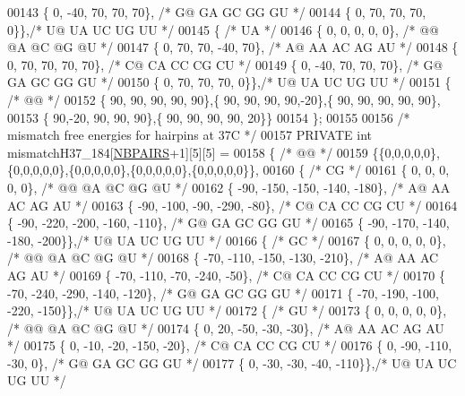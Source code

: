 \begin{DoxyCode}
00143    \{   0,  -40,   70,   70,   70\}, \textcolor{comment}{/* G@  GA  GC  GG  GU */}
00144    \{   0,   70,   70,   70,    0\}\},\textcolor{comment}{/* U@  UA  UC  UG  UU */}
00145   \{ \textcolor{comment}{/* UA */}
00146    \{   0,    0,    0,    0,    0\}, \textcolor{comment}{/* @@  @A  @C  @G  @U */}
00147    \{   0,   70,   70,  -40,   70\}, \textcolor{comment}{/* A@  AA  AC  AG  AU */}
00148    \{   0,   70,   70,   70,   70\}, \textcolor{comment}{/* C@  CA  CC  CG  CU */}
00149    \{   0,  -40,   70,   70,   70\}, \textcolor{comment}{/* G@  GA  GC  GG  GU */}
00150    \{   0,   70,   70,   70,    0\}\},\textcolor{comment}{/* U@  UA  UC  UG  UU */}
00151   \{ \textcolor{comment}{/* @@ */}
00152    \{ 90, 90, 90, 90, 90\},\{ 90, 90, 90, 90,-20\},\{ 90, 90, 90, 90, 90\},
00153    \{ 90,-20, 90, 90, 90\},\{ 90, 90, 90, 90, 20\}\}
00154 \};
00155 
00156 \textcolor{comment}{/* mismatch free energies for hairpins at 37C */}
00157 PRIVATE \textcolor{keywordtype}{int} mismatchH37\_184[\hyperlink{energy__const_8h_a5e75221c779d618eab81e096f37e32ce}{NBPAIRS}+1][5][5] =
00158 \{ \textcolor{comment}{/* @@ */}
00159   \{\{0,0,0,0,0\},\{0,0,0,0,0\},\{0,0,0,0,0\},\{0,0,0,0,0\},\{0,0,0,0,0\}\},
00160   \{ \textcolor{comment}{/* CG */}
00161    \{   0,    0,    0,    0,    0\}, \textcolor{comment}{/* @@  @A  @C  @G  @U */}
00162    \{ -90, -150, -150, -140, -180\}, \textcolor{comment}{/* A@  AA  AC  AG  AU */}
00163    \{ -90, -100,  -90, -290,  -80\}, \textcolor{comment}{/* C@  CA  CC  CG  CU */}
00164    \{ -90, -220, -200, -160, -110\}, \textcolor{comment}{/* G@  GA  GC  GG  GU */}
00165    \{ -90, -170, -140, -180, -200\}\},\textcolor{comment}{/* U@  UA  UC  UG  UU */}
00166   \{ \textcolor{comment}{/* GC */}
00167    \{   0,    0,    0,    0,    0\}, \textcolor{comment}{/* @@  @A  @C  @G  @U */}
00168    \{ -70, -110, -150, -130, -210\}, \textcolor{comment}{/* A@  AA  AC  AG  AU */}
00169    \{ -70, -110,  -70, -240,  -50\}, \textcolor{comment}{/* C@  CA  CC  CG  CU */}
00170    \{ -70, -240, -290, -140, -120\}, \textcolor{comment}{/* G@  GA  GC  GG  GU */}
00171    \{ -70, -190, -100, -220, -150\}\},\textcolor{comment}{/* U@  UA  UC  UG  UU */}
00172   \{ \textcolor{comment}{/* GU */}
00173    \{   0,    0,    0,    0,    0\}, \textcolor{comment}{/* @@  @A  @C  @G  @U */}
00174    \{   0,   20,  -50,  -30,  -30\}, \textcolor{comment}{/* A@  AA  AC  AG  AU */}
00175    \{   0,  -10,  -20, -150,  -20\}, \textcolor{comment}{/* C@  CA  CC  CG  CU */}
00176    \{   0,  -90, -110,  -30,    0\}, \textcolor{comment}{/* G@  GA  GC  GG  GU */}
00177    \{   0,  -30,  -30,  -40, -110\}\},\textcolor{comment}{/* U@  UA  UC  UG  UU */}

\end{DoxyCode}
